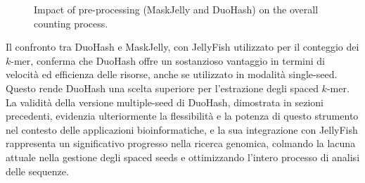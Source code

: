 \begin{figure}[!ht]
	\centering
	\caption{Impact of pre-processing (MaskJelly and DuoHash) on the overall counting process.}
	\label{fig:incidence-on-jellyfish}
\end{figure}

Il confronto tra DuoHash e MaskJelly, con JellyFish utilizzato per il conteggio dei $k$-mer, conferma che DuoHash offre un sostanzioso vantaggio in termini di velocità ed efficienza delle risorse, anche se utilizzato in modalità single-seed. Questo rende DuoHash una scelta superiore per l'estrazione degli spaced $k$-mer. La validità della versione multiple-seed di DuoHash, dimostrata in sezioni precedenti, evidenzia ulteriormente la flessibilità e la potenza di questo strumento nel contesto delle applicazioni bioinformatiche, e la sua integrazione con JellyFish rappresenta un significativo progresso nella ricerca genomica, colmando la lacuna attuale nella gestione degli spaced seeds e ottimizzando l'intero processo di analisi delle sequenze.
